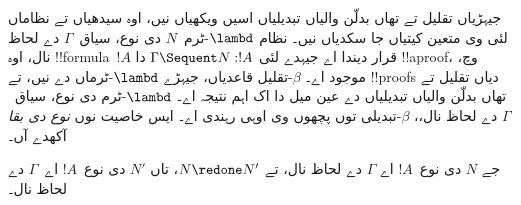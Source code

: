 \documentclass[../../../include/open-logic-section]{subfiles}
\begin{document}


جیہڑیاں تقلیل تے تھاں بدلّن والیاں تبدیلیاں اسیں ویکھیاں نیں، اوہ سیدھیاں  تے  نظاماں لئی وی متعین کیتیاں جا سکدیاں نیں۔  نظام $\lambd$-ٹرم~$N$ دی نوع، سیاق~$\Gamma$ دے لحاظ نال، اوہ !!{formula}~$!A$ قرار دیندا اے جیہدے لئی $ \Gamma \Sequent N
: !A$ دا !!a{proof}،  وچ، موجود اے۔ $\beta$-تقلیل قاعدیاں، جیہڑے $\lambd$-ٹرماں دے نیں، تے !!{proof}s دیاں تقلیل تے تھاں بدلّن والیاں تبدیلیاں دے عین میل دا اک اہم نتیجہ اے۔ $\lambd$-ٹرم دی نوع، سیاق~$\Gamma$ دے لحاظ نال،، $\beta$-تبدیلی توں پچھوں وی اوہی رہندی اے۔ ایس خاصیت نوں \emph{نوع دی بقا} آکھدے آں۔

\begin{prop}
جے $N$ دی نوع~$!A$ اے $ \Gamma$ دے لحاظ نال، تے $N \redone N'$، تاں $N'$ دی نوع~$!A$ اے~$\Gamma$ دے لحاظ نال۔
\end{prop}
\end{document}
